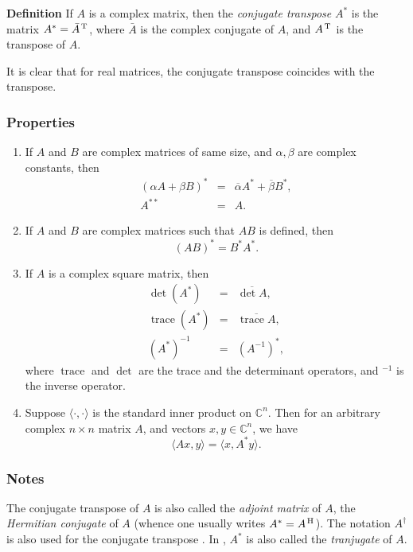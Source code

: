 \documentclass[12pt]{article}
\newcommand{\sC}[0]{\mathbb{C}}
\begin{document}
\def\dtra{\hspace{0.04cm} ^{\mbox{\scriptsize{T}}} \hspace{0.02cm}}
\def\htra{\hspace{0.04cm} ^{\mbox{\scriptsize{H}}} \hspace{0.02cm}}

{\bf Definition} If $A$ is a complex matrix, then the 
\emph{conjugate transpose} $A^\ast$ is the matrix 
$A^\ast = \bar{A}\dtra$, where $\bar{A}$ is
the complex conjugate of $A$, and $A\dtra$ is the 
transpose of $A$. 

It is clear that for real matrices, the conjugate transpose coincides with
the transpose. 

\subsubsection{Properties}
\begin{enumerate}
\item If $A$ and $B$ are complex matrices of same size, and $\alpha,\beta$
are complex constants, then
\begin{eqnarray*}
  (\alpha A + \beta B)^\ast &=& \overline{\alpha} A^\ast + \overline{\beta} B^\ast,\\
  A^{\ast\ast} &=& A.
\end{eqnarray*}

\item If $A$ and $B$ are complex matrices such that $AB$ is defined, then 
$$ (AB)^\ast = B^\ast A^\ast.$$
\item If $A$ is a complex square matrix, then 
\begin{eqnarray*}
 \det (A^\ast) &=& \overline{ \det{A}}, \\
\operatorname{trace}(A^\ast) &=& \overline{ \operatorname{trace}{A}}, \\
(A^\ast)^{-1} &=& (A^{-1})^\ast,
\end{eqnarray*}
where $\operatorname{trace}$ and $\operatorname{det}$ are the trace 
and the determinant operators, and $^{-1}$ is the inverse operator. 
\item Suppose $\langle \cdot, \cdot \rangle$ is the standard inner product on $\sC^n$. 
Then for an arbitrary complex $n\times n$ matrix $A$,  
and vectors $x,y\in \sC^n$, we have 
$$ \langle Ax,y\rangle = \langle x,A^\ast y \rangle.$$
\end{enumerate}

\subsubsection*{Notes}
The conjugate transpose of $A$ is also called the \emph{adjoint matrix} of $A$, 
the \emph{Hermitian conjugate} of $A$ (whence one usually writes $A^\ast = A\htra$).
The notation $A^\dagger$ is also used for the conjugate transpose \cite{pease}. 
In \cite{eves}, $A^\ast$ is also called the \emph{tranjugate} of $A$.
\end{document}
